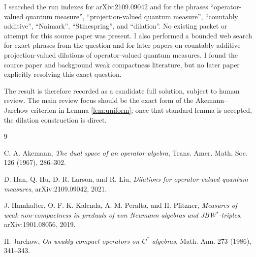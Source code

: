 \documentclass[11pt]{article}
\begin{document}
I searched the run indexes for arXiv:2109.09042 and for the phrases
``operator-valued quantum measure'', ``projection-valued quantum measure'',
``countably additive'', ``Naimark'', ``Stinespring'', and ``dilation''.  No
existing packet or attempt for this source paper was present.  I also performed a
bounded web search for exact phrases from the question and for later papers on
countably additive projection-valued dilations of operator-valued quantum
measures.  I found the source paper and background weak compactness literature,
but no later paper explicitly resolving this exact question.

The result is therefore recorded as a candidate full solution, subject to human
review.  The main review focus should be the exact form of the
Akemann--Jarchow criterion in Lemma \ref{lem:uniform}; once that standard lemma is
accepted, the dilation construction is direct.

\begin{thebibliography}{9}

C. A. Akemann, \emph{The dual space of an operator algebra}, Trans. Amer. Math.
Soc. 126 (1967), 286--302.

D. Han, Q. Hu, D. R. Larson, and R. Liu, \emph{Dilations for operator-valued
quantum measures}, arXiv:2109.09042, 2021.

J. Hamhalter, O. F. K. Kalenda, A. M. Peralta, and H. Pfitzner, \emph{Measures
of weak non-compactness in preduals of von Neumann algebras and
JBW\(^*\)-triples}, arXiv:1901.08056, 2019.

H. Jarchow, \emph{On weakly compact operators on \(C^*\)-algebras}, Math. Ann.
273 (1986), 341--343.

\end{thebibliography}
\end{document}
